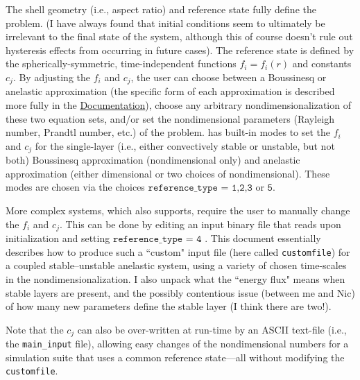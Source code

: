 \documentclass[12pt]{article}
\numberwithin{equation}{section}
\begin{document}
The shell geometry (i.e., aspect ratio) and reference state fully define the problem. (I have always found that initial conditions seem to ultimately be irrelevant to the final state of the system, although this of course doesn't rule out hysteresis effects from occurring in future cases). The reference state is defined by the spherically-symmetric, time-independent functions $f_i=f_i(r)$ and constants $c_j$. By adjusting the $f_i$ and $c_j$, the user can choose between a Boussinesq or anelastic approximation (the specific form of each approximation is described more fully in the  \href{https://rayleigh-documentation.readthedocs.io/en/latest/doc/source/User_Guide/physics_math_overview.html#the-system-of-equations-solved-in-rayleigh}{Documentation}), choose any arbitrary nondimensionalization of these two equation sets, and/or set the nondimensional parameters (Rayleigh number, Prandtl number, etc.) of the problem.  {\rayleigh} has built-in modes to set the $f_i$ and $c_j$ for the single-layer (i.e., either convectively stable or unstable, but not both) Boussinesq approximation (nondimensional only) and anelastic approximation (either dimensional or two choices of nondimensional). These modes are chosen via the choices $\texttt{reference\_type = 1,2,3}$ or $\texttt{5}$. 

More complex systems, which {\rayleigh} also supports, require the user to manually change the $f_i$ and $c_j$. This can be done by editing an input binary file that {\rayleigh} reads upon initialization and setting $\texttt{reference\_type = 4}$ . This document essentially describes how to produce such a ``custom" input file (here called {\texttt{customfile}}) for a coupled stable--unstable anelastic system, using a variety of chosen time-scales in the nondimensionalization. I also unpack what the ``energy flux" means when stable layers are present, and the possibly contentious issue (between me and Nic) of how many new parameters define the stable layer (I think there are two!). 

Note that the $c_j$ can also be over-written at run-time by an ASCII text-file (i.e., the \texttt{main\_input} file), allowing easy changes of the nondimensional numbers for a simulation suite that uses a common reference state---all without modifying the  {\texttt{customfile}}.
	
\end{document}
